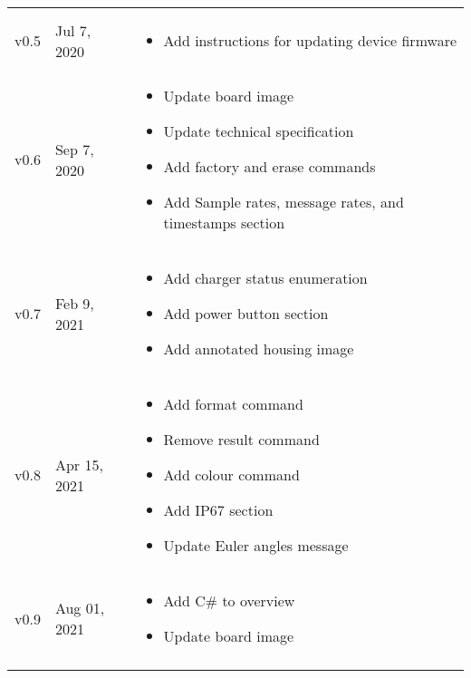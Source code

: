 \begin{longtable}{| >{\centering}p{} | p{} | >{\raggedright\arraybackslash}p{} |}
\begin{itemize}
        \end{itemize}\\
        v0.5 & Jul 7, 2020 &
        \begin{itemize}
			\item Add instructions for updating device firmware
        \end{itemize}\\
        v0.6 & Sep 7, 2020 &
        \begin{itemize}
			\item Update board image
			\item Update technical specification
			\item Add factory and erase commands
			\item Add Sample rates, message rates, and timestamps section
        \end{itemize}\\
        v0.7 & Feb 9, 2021 &
        \begin{itemize}
			\item Add charger status enumeration
			\item Add power button section
			\item Add annotated housing image
        \end{itemize}\\
        v0.8 & Apr 15, 2021 &
        \begin{itemize}
			\item Add format command
			\item Remove result command
			\item Add colour command
			\item Add \ac{IP67} section
			\item Update Euler angles message
        \end{itemize}\\
        v0.9 & Aug 01, 2021 &
        \begin{itemize}
			\item Add C\# to overview
			\item Update board image
        \end{itemize}\\        
        \arrayrulecolor{gray!50}\hline
    \end{longtable}
\endgroup
